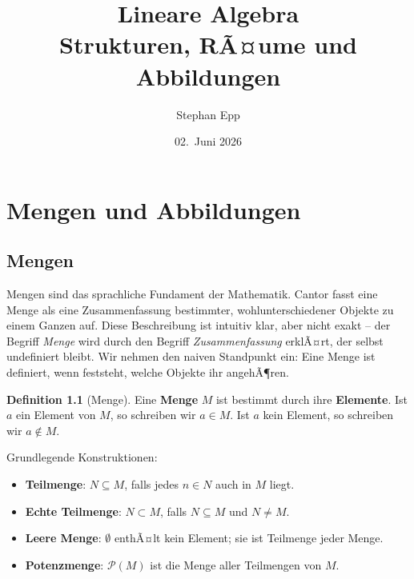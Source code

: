 ﻿\documentclass[a4paper,12pt]{report}
\title{\textbf{Lineare Algebra} \\ {\Large Strukturen, RÃ¤ume und Abbildungen}}
\author{Stephan Epp}
\date{02.\ Juni 2026}
\theoremstyle{definition}
\newtheorem{definition}{Definition}
\begin{document}
\renewcommand{\proofname}{Beweis}
\maketitle
\tableofcontents
\newpage

\chapter{Mengen und Abbildungen}

\section{Mengen}

Mengen sind das sprachliche Fundament der Mathematik. Cantor fasst eine Menge als
eine Zusammenfassung bestimmter, wohlunterschiedener Objekte zu einem Ganzen auf.
Diese Beschreibung ist intuitiv klar, aber nicht exakt -- der Begriff \emph{Menge}
wird durch den Begriff \emph{Zusammenfassung} erklÃ¤rt, der selbst undefiniert bleibt.
Wir nehmen den naiven Standpunkt ein: Eine Menge ist definiert, wenn feststeht,
welche Objekte ihr angehÃ¶ren.

\begin{definition}[Menge]
    Eine \textbf{Menge} $M$ ist bestimmt durch ihre \textbf{Elemente}. Ist $a$ ein
    Element von $M$, so schreiben wir $a \in M$. Ist $a$ kein Element, so schreiben
    wir $a \notin M$.

    Grundlegende Konstruktionen:
    \begin{itemize}
        \item[-] \textbf{Teilmenge}: $N \subseteq M$, falls jedes $n \in N$ auch in $M$ liegt.
        \item[-] \textbf{Echte Teilmenge}: $N \subset M$, falls $N \subseteq M$ und
              $N \neq M$.
        \item[-] \textbf{Leere Menge}: $\emptyset$ enthÃ¤lt kein Element; sie ist
              Teilmenge jeder Menge.
        \item[-] \textbf{Potenzmenge}: $\mathcal{P}(M)$ ist die Menge aller
              Teilmengen von $M$.
    \end{itemize}
\end{definition}
\end{document}
